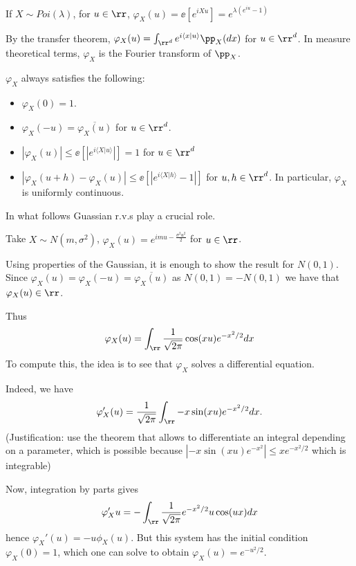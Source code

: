 \documentclass[../main.tex]{subfiles}
\begin{document}
\begin{example}
  If $X \sim Poi(\lambda)$, for $u \in \rr$, $\varphi_X(u) = \ee[e^{iXu}] =
  e^{\lambda(e^{iu} - 1)}$
\end{example}

\begin{remark}
  By the transfer theorem, $\varphi_X(u) = \int_{\rr^d} e^{i \langle x | u
  \rangle} \pp_X(dx)$ for $u \in \rr^d$. In measure theoretical terms,
  $\varphi_X$ is the Fourier transform of $\pp_X$.
\end{remark}

\begin{proposition}
    $\varphi_X$ always satisfies the following:
    \begin{itemize}
      \item $\varphi_X(0) = 1$.
      \item $\varphi_X(-u) = \overline{\varphi_X(u)}$ for $u \in \rr^d$.
      \item $|\varphi_X(u)| \leq \ee[|e^{i \langle X | u \rangle}|] = 1$ for
        $u \in \rr^d$
      \item $|\varphi_X(u + h) - \varphi_X(u)| \leq \ee[ |e^{i \langle X | h \rangle} -
        1|]$ for $u, h \in \rr^d$. In particular, $\varphi_X$ is uniformly
        continuous.
    \end{itemize}
\end{proposition}

In what follows Guassian r.v.s play a crucial role.
\begin{example}
  Take $X \sim N (m, \sigma^2)$, $\varphi_X(u) = e^{imu - \frac{\sigma^2u^2}{2}
  }$ for $u \in \rr$.
\end{example}
\begin{sketch}
  Using properties of the Gaussian, it is enough to show the result for $N(0,
  1)$. Since $\varphi_X(u) = \varphi_X(-u) = \overline{\varphi_X(u)}$ as $N(0,1) = -N(0,1)$
  we have that $\varphi_X(u) \in \rr$. 

  Thus $$\varphi_X(u) = \int_{\rr} \frac{1}{\sqrt{2\pi}} \cos(xu)
  e^{-x^2/2} dx$$ To compute this, the idea is to see that $\varphi_X$ solves a
  differential equation.
  
  Indeed, we have 
  \[
    \varphi_X'(u) = \frac{1}{\sqrt{2\pi}} \int_{\rr} -x \sin(xu)e^{-x^2 /
    2}dx.
  \] (Justification: use the theorem that allows to differentiate an integral
  depending on a parameter, which is possible because $|-x\sin(xu) e^{-x^2}|
  \leq x e^{-x^2/2}$ which is integrable)

  Now, integration by parts gives
  \[
    \varphi_X'{u} = -\int_{\rr} \frac{1}{\sqrt{2\pi}} e^{-x^2/2} u \cos(ux)dx
  \]
  hence $\varphi_X'(u) = -u \phi_X(u)$. But this system has the initial
  condition $\varphi_X(0) = 1$, which one can solve to obtain $\varphi_X(u) =
  e^{-u^2/2}$.
\end{sketch}
\end{document}
